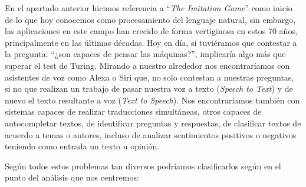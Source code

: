 En el apartado anterior hicimos referencia a ``\textit{The Imitation Game}'' como inicio de lo que hoy conocemos como procesamiento del lenguaje natural, sin embargo, las aplicaciones en este campo han crecido de forma vertiginosa en estos 70 años, principalmente en las últimas décadas. Hoy en día, si tuviéramos que contestar a la pregunta: ``¿son capaces de pensar las máquinas?'', implicaría algo más que superar el test de Turing. Mirando a nuestro alrededor nos encontraríamos con asistentes de voz como Alexa o Siri que, no solo contestan a nuestras preguntas, si no que realizan un trabajo de pasar nuestra voz a texto (\textit{Speech to Text}) y de nuevo el texto resultante a voz (\textit{Text to Speech}). Nos encontraríamos también con sistemas capaces de realizar traducciones simultáneas, otros capaces de autocompletar textos, de identificar preguntas y respuestas, de clasificar textos de acuerdo a temas o autores, incluso de analizar sentimientos positivos o negativos teniendo como entrada un texto u opinión.


Según \cite{goldberg_2017} todos estos problemas tan diversos podríamos clasificarlos según en el punto del análisis que nos centremos: 

